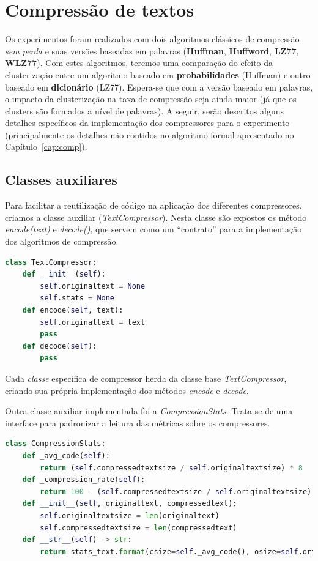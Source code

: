 \section{Compressão de textos}
Os experimentos foram realizados com dois algoritmos clássicos de compressão \emph{sem perda} e suas versões baseadas em palavras (\textbf{Huffman}, \textbf{Huffword}, \textbf{LZ77}, \textbf{WLZ77}).
Com estes algoritmos, teremos uma comparação do efeito da clusterização entre um algoritmo baseado em \textbf{probabilidades} (Huffman)  e outro baseado em \textbf{dicionário} (LZ77).
Espera-se que com a versão baseado em palavras, o impacto da clusterização na taxa de compressão seja ainda maior (já que os clusters são formados a nível de palavras).
A seguir, serão descritos alguns detalhes específicos da implementação dos compressores para o experimento (principalmente os detalhes não contidos no algoritmo formal apresentado no Capítulo~\ref{cap:comp}).

\subsection{Classes auxiliares}
Para facilitar a reutilização de código na aplicação dos diferentes compressores, criamos a classe auxiliar (\emph{TextCompressor}).
Nesta classe são expostos os método \emph{encode(text)} e \emph{decode()}, que servem como um ``contrato'' para a implementação dos algoritmos de compressão.

\begin{lstlisting}[language=Python, caption=Classe TextCompressor]
class TextCompressor:
    def __init__(self):
        self.originaltext = None
        self.stats = None
    def encode(self, text):
        self.originaltext = text
        pass
    def decode(self):
        pass
\end{lstlisting}

Cada \emph{classe} específica de compressor herda da classe base \emph{TextCompressor}, criando sua própria implementação dos métodos \emph{encode} e \emph{decode}.

Outra classe auxiliar implementada foi a \emph{CompressionStats}. Trata-se de uma interface para padronizar a leitura das métricas sobre os compressores.
\begin{lstlisting}[language=Python, caption=Implementaçào da classe base CompressionStats]
class CompressionStats:
    def _avg_code(self):
        return (self.compressedtextsize / self.originaltextsize) * 8
    def _compression_rate(self):
        return 100 - (self.compressedtextsize / self.originaltextsize) * 100
    def __init__(self, originaltext, compressedtext):
        self.originaltextsize = len(originaltext)
        self.compressedtextsize = len(compressedtext)
    def __str__(self) -> str:
        return stats_text.format(csize=self._avg_code(), osize=self.originaltextsize, nsize=self.compressedtextsize, crate=self._compression_rate())
\end{lstlisting}

